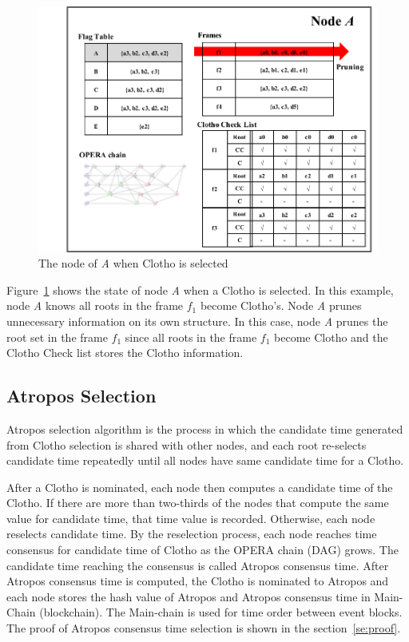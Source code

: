 \documentclass{article}
\begin{document}
\begin{figure}[H] \centering  
	\includegraphics[width=1.0\columnwidth]{Clotho_fig2.pdf}
	\caption{The node of \textit{A} when Clotho is selected}
	\label{fig:ClothoNodeA}	
\end{figure}

Figure~\ref{fig:ClothoNodeA} shows the state of node \textit{A} when a Clotho is selected. In this example, node \textit{A} knows all roots in the frame $f_1$ become Clotho's. Node \textit{A} prunes unnecessary information on its own structure. In this case, node \textit{A} prunes the root set in the frame $f_1$ since all roots in the frame $f_1$ become Clotho and the Clotho Check list stores the Clotho information. 

\subsection{Atropos Selection}

Atropos selection algorithm is the process in which the candidate time generated from Clotho selection is shared with other nodes, and each root re-selects candidate time repeatedly until all nodes have same candidate time for a Clotho. 

After a Clotho is nominated, each node then computes a candidate time of the Clotho. If there are more than two-thirds of the nodes that compute the same value for candidate time, that time value is recorded. Otherwise, each node reselects candidate time. By the reselection process, each node reaches time consensus for candidate time of Clotho as the OPERA chain (DAG) grows. The candidate time reaching the consensus is called Atropos consensus time. After Atropos consensus time is computed, the Clotho is nominated to Atropos and each node stores the hash value of Atropos and Atropos consensus time in Main-Chain (blockchain). The Main-chain is used for time order between event blocks. The proof of Atropos consensus time selection is shown in the section~\ref{se:proof}. 
\end{document}
